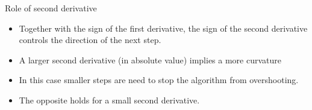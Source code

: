 \documentclass[10pt]{beamer}
\begin{document}
\begin{frame}{Role of second derivative}
  \begin{itemize}
  \item Together with the sign of the first derivative, the sign of the second derivative controls the direction of the next step.

  \item A larger second derivative (in absolute value) implies a more curvature

  \item In this case smaller steps are need to stop the algorithm from overshooting.

  \item The opposite holds for a small second derivative.
  \end{itemize}
\end{frame}
\end{document}
